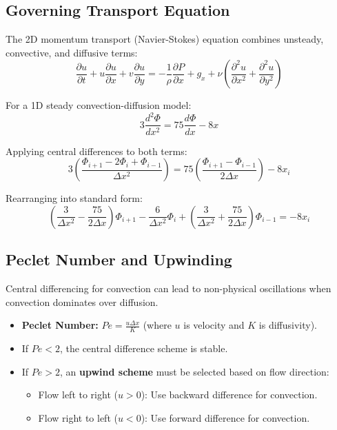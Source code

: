\documentclass{article}
\begin{document}
\subsection{Governing Transport Equation}

The 2D momentum transport (Navier-Stokes) equation combines unsteady, convective, and diffusive terms:
\begin{equation}
    \frac{\partial u}{\partial t} + u\frac{\partial u}{\partial x} + v\frac{\partial u}{\partial y} = -\frac{1}{\rho}\frac{\partial P}{\partial x} + g_x + \nu \left( \frac{\partial^2 u}{\partial x^2} + \frac{\partial^2 u}{\partial y^2} \right)
\end{equation}

For a 1D steady convection-diffusion model:
\begin{equation}
    3\frac{d^2\Phi}{dx^2} = 75\frac{d\Phi}{dx} - 8x
\end{equation}

Applying central differences to both terms:
\begin{equation}
    3\left(\frac{\Phi_{i+1} - 2\Phi_i + \Phi_{i-1}}{\Delta x^2}\right) = 75\left(\frac{\Phi_{i+1} - \Phi_{i-1}}{2\Delta x}\right) - 8x_i
\end{equation}

Rearranging into standard form:
\begin{equation}
    \left(\frac{3}{\Delta x^2} - \frac{75}{2\Delta x}\right)\Phi_{i+1} - \frac{6}{\Delta x^2}\Phi_i + \left(\frac{3}{\Delta x^2} + \frac{75}{2\Delta x}\right)\Phi_{i-1} = -8x_i
\end{equation}

\subsection{Peclet Number and Upwinding}

Central differencing for convection can lead to non-physical oscillations when convection dominates over diffusion.

\begin{itemize}
    \item \textbf{Peclet Number:} $Pe = \frac{u \Delta x}{K}$ (where $u$ is velocity and $K$ is diffusivity).
    \item If $Pe < 2$, the central difference scheme is stable.
    \item If $Pe > 2$, an \textbf{upwind scheme} must be selected based on flow direction:
          \begin{itemize}
              \item Flow left to right ($u > 0$): Use backward difference for convection.
              \item Flow right to left ($u < 0$): Use forward difference for convection.
          \end{itemize}
\end{itemize}
\end{document}
